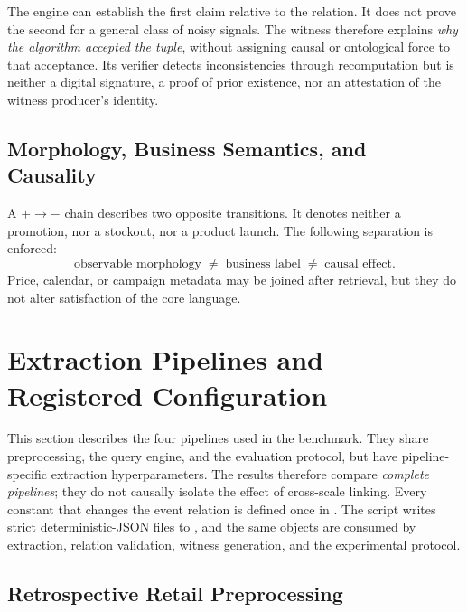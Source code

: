 The engine can establish the first claim relative to the relation. It does not prove the second for a general class of noisy signals. The witness therefore explains \emph{why the algorithm accepted the tuple}, without assigning causal or ontological force to that acceptance. Its verifier detects inconsistencies through recomputation but is neither a digital signature, a proof of prior existence, nor an attestation of the witness producer's identity.

\subsection{Morphology, Business Semantics, and Causality}

A $+\rightarrow-$ chain describes two opposite transitions. It denotes neither a promotion, nor a stockout, nor a product launch. The following separation is enforced:
\begin{equation}
\text{observable morphology}\;\neq\;\text{business label}\;\neq\;\text{causal effect}.
\end{equation}
Price, calendar, or campaign metadata may be joined after retrieval, but they do not alter satisfaction of the core language.

\section{Extraction Pipelines and Registered Configuration}

This section describes the four pipelines used in the benchmark. They share preprocessing, the query engine, and the evaluation protocol, but have pipeline-specific extraction hyperparameters. The results therefore compare \emph{complete pipelines}; they do not causally isolate the effect of cross-scale linking. Every constant that changes the event relation is defined once in . The script writes strict deterministic-JSON files to , and the same objects are consumed by extraction, relation validation, witness generation, and the experimental protocol.

\subsection{Retrospective Retail Preprocessing}

